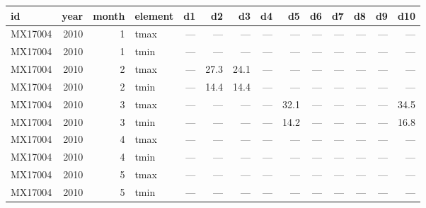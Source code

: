 \begin{tabular}{lrrlrrrrrrrrrr}
  \toprule
 id & year & month & element & d1 & d2 & d3 & d4 & d5 & d6 & d7 & d8 & d9 & d10 \\ 
  \midrule
  MX17004 & 2010 &  1 & tmax & --- & --- & --- & --- & --- & --- & --- & --- & --- & --- \\ 
  MX17004 & 2010 &  1 & tmin & --- & --- & --- & --- & --- & --- & --- & --- & --- & --- \\ 
  MX17004 & 2010 &  2 & tmax & --- & 27.3 & 24.1 & --- & --- & --- & --- & --- & --- & --- \\ 
  MX17004 & 2010 &  2 & tmin & --- & 14.4 & 14.4 & --- & --- & --- & --- & --- & --- & --- \\ 
  MX17004 & 2010 &  3 & tmax & --- & --- & --- & --- & 32.1 & --- & --- & --- & --- & 34.5 \\ 
  MX17004 & 2010 &  3 & tmin & --- & --- & --- & --- & 14.2 & --- & --- & --- & --- & 16.8 \\ 
  MX17004 & 2010 &  4 & tmax & --- & --- & --- & --- & --- & --- & --- & --- & --- & --- \\ 
  MX17004 & 2010 &  4 & tmin & --- & --- & --- & --- & --- & --- & --- & --- & --- & --- \\ 
  MX17004 & 2010 &  5 & tmax & --- & --- & --- & --- & --- & --- & --- & --- & --- & --- \\ 
  MX17004 & 2010 &  5 & tmin & --- & --- & --- & --- & --- & --- & --- & --- & --- & --- \\ 
   \bottomrule
\end{tabular}
